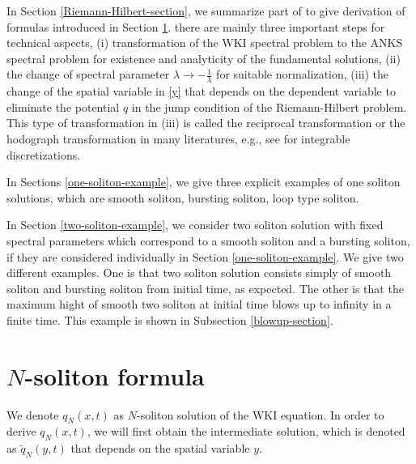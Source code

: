 \documentclass[11pt]{article}
\begin{document}
 In Section \ref{Riemann-Hilbert-section}, we summarize part of \cite{Shimabukuro-present} to give derivation of formulas introduced in Section \ref{soliton-derivation}. there are mainly three important steps for technical aspects, (i) transformation of the WKI spectral problem to the ANKS spectral problem for existence and analyticity of the fundamental solutions, (ii) the change of spectral parameter $\lambda \rightarrow -\frac{1}{\lambda}$ for suitable normalization, (iii) the change of the spatial variable in \eqref{y} that depends on the dependent variable to eliminate the potential $q$ in the jump condition of the Riemann-Hilbert problem. 
This type of transformation in (iii) is called the reciprocal transformation or the hodograph transformation in many literatures, e.g., see \cite{Feng-Inoguchi-Kajiwara-Maruno-2011} for integrable discretizations. 

In Sections \ref{one-soliton-example}, we give three explicit examples of one soliton solutions, which are smooth soliton, bursting soliton, loop type soliton. 

In Section \ref{two-soliton-example}, we consider two soliton solution with fixed spectral parameters which correspond to a smooth soliton and a bursting soliton, if they are considered individually in Section \ref{one-soliton-example}. We give two different examples. One is that two soliton solution consists simply of smooth soliton and bursting soliton from initial time, as expected. The other is that the maximum hight of smooth two soliton at initial time blows up to infinity in a finite time. This example is shown in Subsection \ref{blowup-section}.  

\section{$N$-soliton formula} \label{soliton-derivation}
We denote $q_N(x,t)$ as $N$-soliton solution of the WKI equation. In order to derive $q_{N}(x,t)$, we will first obtain the intermediate solution, which is denoted as $\tilde{q}_{N}(y,t)$ that depends on the spatial variable $y$.   
\end{document}
